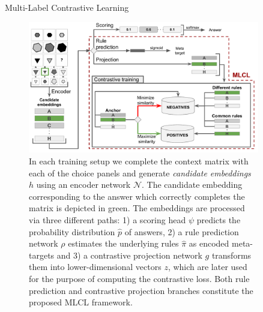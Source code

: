 \documentclass[final]{beamer}
\newlength{\sepwidth}
\newlength{\colwidth}
\newcommand{\separatorcolumn}{\begin{column}{\sepwidth}\end{column}}
\begin{document}
\begin{frame}[t]
\begin{columns}[t]
\begin{column}{\colwidth}
                \begin{block}{Multi-Label Contrastive Learning}
                    \begin{figure}
                        \centering
                        \includegraphics[width=0.8\columnwidth]{MLCL_wide}
                        \caption{
                        In each training setup we complete the context matrix with each of the choice panels and generate \textit{candidate embeddings} $h$ using an encoder network $\mathcal{N}$.
                        The candidate embedding corresponding to the answer which correctly completes the matrix is depicted in green.
                        The embeddings are processed via three different paths: 1) a scoring head $\psi$ predicts the probability distribution $\hat{p}$ of answers, 2) a rule prediction network $\rho$ estimates the underlying rules $\hat{\pi}$ as encoded meta-targets and 3) a contrastive projection network $g$ transforms them into lower-dimensional vectors $z$, which are later used for the purpose of computing the contrastive loss.
                        Both rule prediction and contrastive projection branches constitute the proposed MLCL framework.
                        }
                        \label{fig:mlcl}
                    \end{figure}
                \end{block}

            \end{column}

            \separatorcolumn

            \begin{column}{\colwidth}


\end{column}
\end{columns}
\end{frame}
\end{document}
